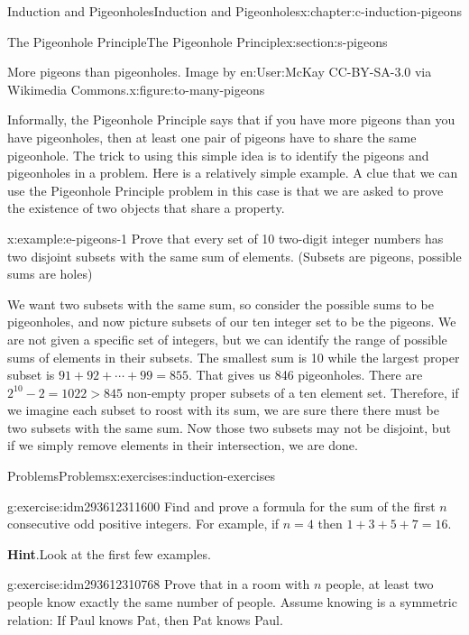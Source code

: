 \documentclass[twoside,10pt,]{book}
\newcommand{\blocktitlefont}{\relax}
\numberwithin{equation}{section}
\begin{document}
\begin{chapterptx}{Induction and Pigeonholes}{}{Induction and Pigeonholes}{}{}{x:chapter:c-induction-pigeons}
\begin{sectionptx}{The Pigeonhole Principle}{}{The Pigeonhole Principle}{}{}{x:section:s-pigeons}
\begin{figureptx}{More pigeons than pigeonholes.  Image by en:User:McKay CC-BY-SA-3.0 via Wikimedia Commons.}{x:figure:to-many-pigeons}{}
\begin{image}{0}{1}{0}
\end{image}%
\tcblower
\end{figureptx}%
Informally, the Pigeonhole Principle says that if you have more pigeons than you have pigeonholes, then at least one pair of pigeons have to share the same pigeonhole. The trick to using this simple idea is to identify the pigeons and pigeonholes in a problem.  Here is a relatively simple example. A clue that we can use the Pigeonhole Principle problem in this case is that we are asked to prove the existence of two objects that share a property.%
\begin{example}{}{x:example:e-pigeons-1}%
Prove that every set of 10 two-digit integer numbers has two disjoint subsets with the same sum of elements. (Subsets are pigeons, possible sums are holes)%
\par
We want two subsets with the same sum, so consider the possible sums to be pigeonholes, and now picture subsets of our ten integer set to be the pigeons. We are not given a specific set of integers, but we can identify the range of possible sums of elements in their subsets.  The smallest sum is 10 while the largest proper subset is \(91+92+\cdots+99 =855 \). That gives us 846 pigeonholes.  There are \(2^{10}-2 = 1022 > 845\) non-empty proper subsets of a ten element set.  Therefore, if we imagine each subset to roost with its sum, we are sure there there must be two subsets with the same sum.  Now those two subsets may not be disjoint, but if we simply remove elements in their intersection, we are done.%
\end{example}
\end{sectionptx}
%
%
\typeout{************************************************}
\typeout{************************************************}
%
\begin{exercises-section}{Problems}{}{Problems}{}{}{x:exercises:induction-exercises}
\begin{divisionexercise}{1}{}{}{g:exercise:idm293612311600}%
Find and prove a formula for the sum of the first \(n\) consecutive odd positive integers. For example, if \(n = 4\) then \(1 + 3 + 5 + 7 = 16\).%
\par\smallskip%
\noindent\textbf{\blocktitlefont Hint}.\label{g:hint:idm293612310304}{}\hypertarget{g:hint:idm293612310304}{}\quad{}Look at the first few examples.%
\end{divisionexercise}%
\begin{divisionexercise}{2}{}{}{g:exercise:idm293612310768}%
Prove that in a room with \(n\) people, at least two people know exactly the same number of people. Assume knowing is a symmetric relation: If Paul knows Pat, then Pat knows Paul.%

\end{divisionexercise}
\end{exercises-section}
\end{chapterptx}
\end{document}
